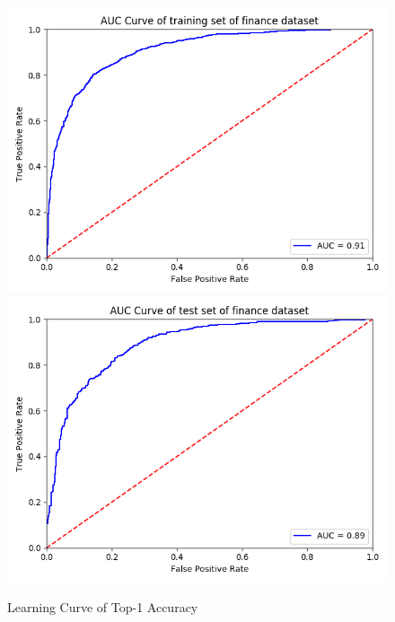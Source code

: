 \documentclass{article}
\begin{document}
\FloatBarrier


\begin{figure}[h]
  \centering
  \includegraphics[scale=0.3]{finance_auc_train.png}
  \includegraphics[scale=0.3]{finance_auc_test.png}
  \caption{Learning Curve of Top-1 Accuracy}
\end{figure}

\pagebreak
\end{document}

